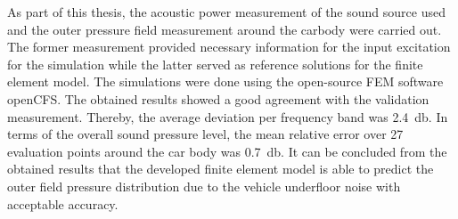 As part of this thesis, the acoustic power measurement of the sound source used and the outer pressure field measurement around the carbody were carried out. The former measurement provided necessary information for the input excitation for the simulation while the latter served as reference solutions for the finite element model.
The simulations were done using the open-source FEM software openCFS. The obtained results showed a good agreement with the validation measurement. Thereby, the average deviation per frequency band was \SI{2.4}{\decibel}. In terms of the overall sound pressure level, the mean relative error over 27 evaluation points around the car body was \SI{0.7}{\decibel}. It can be concluded from the obtained results that the developed finite element model is able to predict the outer field pressure distribution due to the vehicle underfloor noise with acceptable accuracy.


